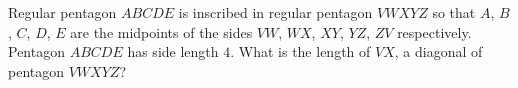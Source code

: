 Regular pentagon $ABCDE$ is inscribed in regular pentagon $VWXYZ$ so that $A$, $B$, $C$, $D$, $E$ are the midpoints of the sides $VW$, $WX$, $XY$, $YZ$, $ZV$ respectively. Pentagon $ABCDE$ has side length $4$. What is the length of $VX$, a diagonal of pentagon $VWXYZ$?
